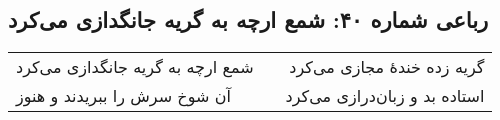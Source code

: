 \begin{center}
\section*{رباعی شماره ۴۰: شمع ارچه به گریه جانگدازی می‌کرد}
\label{sec:040}
\begin{longtable}{l p{0.5cm} r}
شمع ارچه به گریه جانگدازی می‌کرد
&&
گریه زده خندهٔ مجازی می‌کرد
\\
آن شوخ سرش را ببریدند و هنوز
&&
استاده بد و زبان‌درازی می‌کرد
\\
\end{longtable}
\end{center}
